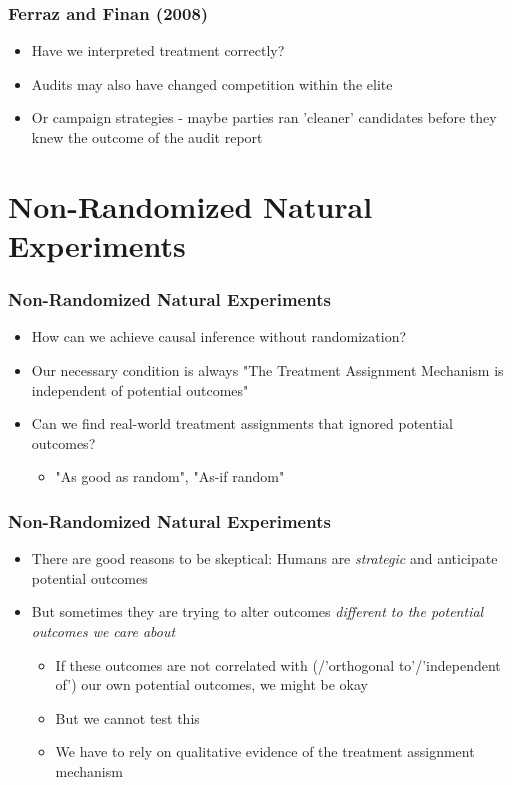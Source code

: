 \documentclass[xcolor=x11names,compress]{beamer}\usepackage[]{graphicx}\usepackage[]{color}
\renewcommand{\(}{\begin{columns}}
\renewcommand{\)}{\end{columns}}
\newcommand{\<}[1]{\begin{column}{#1}}
\renewcommand{\>}{\end{column}}
\begin{document}
\begin{frame}
\frametitle{Ferraz and Finan (2008)}
\begin{itemize}
\item Have we interpreted treatment correctly?
\pause
\item Audits may also have changed competition within the elite
\pause
\item Or campaign strategies - maybe parties ran 'cleaner' candidates before they knew the outcome of the audit report
\end{itemize}
\end{frame}

\section{Non-Randomized Natural Experiments}

\begin{frame}
\frametitle{Non-Randomized Natural Experiments}
\begin{itemize}
\item How can we achieve causal inference without randomization?
\pause
\item Our necessary condition is always "The Treatment Assignment Mechanism is independent of potential outcomes"
\pause
\item Can we find real-world treatment assignments that ignored potential outcomes?
\begin{itemize}
\pause
\item "As good as random", "As-if random"
\end{itemize}
\end{itemize}
\end{frame}

\begin{frame}
\frametitle{Non-Randomized Natural Experiments}
\begin{itemize}
\item There are good reasons to be skeptical: Humans are \textit{strategic} and anticipate potential outcomes 
\pause
\item But sometimes they are trying to alter outcomes \textit{different to the potential outcomes we care about}
\pause
\begin{itemize}
\item If these outcomes are not correlated with (/'orthogonal to'/'independent of') our own potential outcomes, we might be okay
\pause
\item But we cannot test this
\pause
\item We have to rely on qualitative evidence of the treatment assignment mechanism
\end{itemize}
\end{itemize}
\end{frame}
\end{document}
